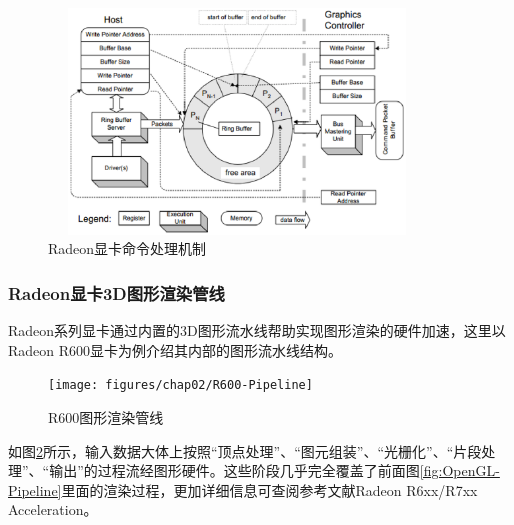 \begin{figure}[H] 
  \centering
  \includegraphics[width=10cm,height=6cm]{figures/chap02/CommandBuffer}
  \caption{Radeon显卡命令处理机制}
  \label{fig:CommandBuffer}
\end{figure}

\subsubsection{Radeon显卡3D图形渲染管线}

Radeon系列显卡通过内置的3D图形流水线帮助实现图形渲染的硬件加速，这里以Radeon R600显卡为例介绍其内部的图形流水线结构。

\begin{figure}[H] 
  \centering
  \texttt{[image: figures/chap02/R600-Pipeline]}
  \caption{R600图形渲染管线}
  \label{fig:R600-Pipeline}
\end{figure}

如图\ref{fig:R600-Pipeline}所示，输入数据大体上按照“顶点处理”、“图元组装”、“光栅化”、“片段处理”、“输出”的过程流经图形硬件。这些阶段几乎完全覆盖了前面图\ref{fig:OpenGL-Pipeline}里面的渲染过程，更加详细信息可查阅参考文献Radeon R6xx/R7xx Acceleration\cite{Radeon-Manual}。
